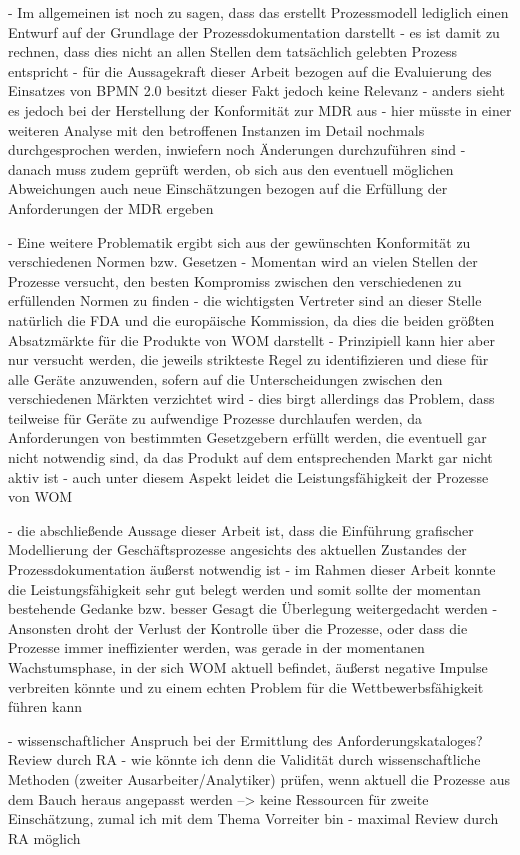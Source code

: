 \documentclass[a4paper,12pt]{report}
\begin{document}
- Im allgemeinen ist noch zu sagen, dass das erstellt Prozessmodell lediglich einen Entwurf auf der Grundlage der Prozessdokumentation darstellt
- es ist damit zu rechnen, dass dies nicht an allen Stellen dem tatsächlich gelebten Prozess entspricht
- für die Aussagekraft dieser Arbeit bezogen auf die Evaluierung des Einsatzes von BPMN 2.0 besitzt dieser Fakt jedoch keine Relevanz
- anders sieht es jedoch bei der Herstellung der Konformität zur MDR aus
- hier müsste in einer weiteren Analyse mit den betroffenen Instanzen im Detail nochmals durchgesprochen werden, inwiefern noch Änderungen durchzuführen sind
- danach muss zudem geprüft werden, ob sich aus den eventuell möglichen Abweichungen auch neue Einschätzungen bezogen auf die Erfüllung der Anforderungen der MDR ergeben

- Eine weitere Problematik ergibt sich aus der gewünschten Konformität zu verschiedenen Normen bzw. Gesetzen
- Momentan wird an vielen Stellen der Prozesse versucht, den besten Kompromiss zwischen den verschiedenen zu erfüllenden Normen zu finden
- die wichtigsten Vertreter sind an dieser Stelle natürlich die FDA und die europäische Kommission, da dies die beiden größten Absatzmärkte für die Produkte von WOM darstellt
- Prinzipiell kann hier aber nur versucht werden, die jeweils strikteste Regel zu identifizieren und diese für alle Geräte anzuwenden, sofern auf die Unterscheidungen zwischen den verschiedenen Märkten verzichtet wird
- dies birgt allerdings das Problem, dass teilweise für Geräte zu aufwendige Prozesse durchlaufen werden, da Anforderungen von bestimmten Gesetzgebern erfüllt werden, die eventuell gar nicht notwendig sind, da das Produkt auf dem entsprechenden Markt gar nicht aktiv ist
- auch unter diesem Aspekt leidet die Leistungsfähigkeit der Prozesse von WOM

- die abschließende Aussage dieser Arbeit ist, dass die Einführung grafischer Modellierung der Geschäftsprozesse angesichts des aktuellen Zustandes der Prozessdokumentation äußerst notwendig ist
- im Rahmen dieser Arbeit konnte die Leistungsfähigkeit sehr gut belegt werden und somit sollte der momentan bestehende Gedanke bzw. besser Gesagt die Überlegung weitergedacht werden
- Ansonsten droht der Verlust der Kontrolle über die Prozesse, oder dass die Prozesse immer ineffizienter werden, was gerade in der momentanen Wachstumsphase, in der sich WOM aktuell befindet, äußerst negative Impulse verbreiten könnte und zu einem echten Problem für die Wettbewerbsfähigkeit führen kann

- wissenschaftlicher Anspruch bei der Ermittlung des Anforderungskataloges? Review durch RA
  - wie könnte ich denn die Validität durch wissenschaftliche Methoden (zweiter Ausarbeiter/Analytiker) prüfen, wenn aktuell die Prozesse aus dem Bauch heraus angepasst werden --> keine Ressourcen für zweite Einschätzung, zumal ich mit dem Thema Vorreiter bin
  - maximal Review durch RA möglich
\end{document}
